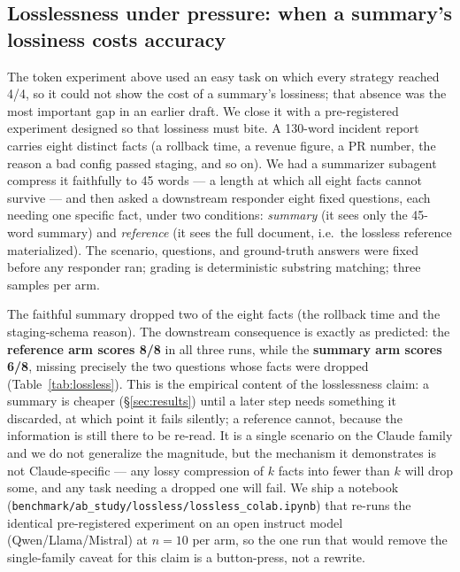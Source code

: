 \documentclass[11pt]{article}
\begin{document}
\subsection{Losslessness under pressure: when a summary's lossiness costs accuracy}\label{sec:lossless}
The token experiment above used an easy task on which every strategy reached 4/4, so it could not show
the cost of a summary's lossiness; that absence was the most important gap in an earlier draft. We
close it with a pre-registered experiment designed so that lossiness must bite. A 130-word incident
report carries eight distinct facts (a rollback time, a revenue figure, a PR number, the reason a bad
config passed staging, and so on). We had a summarizer subagent compress it faithfully to 45 words ---
a length at which all eight facts cannot survive --- and then asked a downstream responder eight fixed
questions, each needing one specific fact, under two conditions: \emph{summary} (it sees only the
45-word summary) and \emph{reference} (it sees the full document, i.e.\ the lossless reference
materialized). The scenario, questions, and ground-truth answers were fixed before any responder ran;
grading is deterministic substring matching; three samples per arm.

The faithful summary dropped two of the eight facts (the rollback time and the staging-schema reason).
The downstream consequence is exactly as predicted: the \textbf{reference arm scores 8/8} in all three
runs, while the \textbf{summary arm scores 6/8}, missing precisely the two questions whose facts were
dropped (Table~\ref{tab:lossless}). This is the empirical content of the losslessness claim: a summary
is cheaper (\S\ref{sec:results}) until a later step needs something it discarded, at which point it
fails silently; a reference cannot, because the information is still there to be re-read. It is a
single scenario on the Claude family and we do not generalize the magnitude, but the mechanism it
demonstrates is not Claude-specific --- any lossy compression of $k$ facts into fewer than $k$ will
drop some, and any task needing a dropped one will fail. We ship a notebook
(\texttt{benchmark/ab\_study/lossless/lossless\_colab.ipynb}) that re-runs the identical pre-registered
experiment on an open instruct model (Qwen/Llama/Mistral) at $n{=}10$ per arm, so the one run that would
remove the single-family caveat for this claim is a button-press, not a rewrite.
\end{document}

